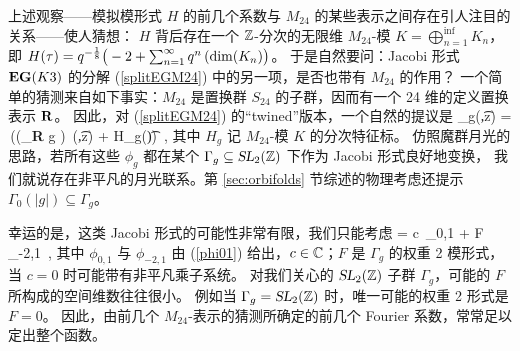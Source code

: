 

上述观察——模拟模形式 $H$ 的前几个系数与 $M_{24}$ 的某些表示之间存在引人注目的关系——使人猜想：
$H$ 背后存在一个 $\mathbb{Z}$-分次的无限维 $M_{24}$-模 $K= \bigoplus_{n=1}^\inf  K_n$，
即 $H(\tau) =q^{-\frac{1}{8}}\big( -2  + \sum_{n=1}^\infty q^n\,({\rm dim}({K_n} )\big)$。
于是自然要问：Jacobi 形式 ${\bf EG}(K3)$ 的分解 (\ref{splitEGM24}) 中的另一项，是否也带有 $M_{24}$ 的作用？
一个简单的猜测来自如下事实：$M_{24}$ 是置换群 $S_{24}$ 的子群，因而有一个 24 维的定义置换表示 ${\bf R}$。
因此，对 (\ref{splitEGM24}) 的“twined”版本，一个自然的提议是
\be\label{K3_EG_Fou}
	 \phi_g(\t,z) 
 		=   \,\big((\tr_{\bf R} {g } ) \,\m(\t,z) + H_g(\t)\big)~,
	\ee
其中 $H_g$ 记 $M_{24}$-模 $K$ 的分次特征标。
仿照魔群月光的思路，若所有这些 $\phi_g$ 都在某个 $\Gamma_g \subseteq \operatorname{\textsl{SL}}_2(\mathbb{Z})$ 下作为 Jacobi 形式良好地变换，
我们就说存在非平凡的月光联系。第 \ref{sec:orbifolds} 节综述的物理考虑还提示 $ \Gamma_0(|g|) \subseteq \Gamma_g$。


幸运的是，这类 Jacobi 形式的可能性非常有限，我们只能考虑
\be
\phi = c\, \phi_{0,1} + F \,\phi_{-2,1}~,
\ee
其中 $\phi_{0,1}$ 与 $\phi_{-2,1}$ 由 (\ref{phi01}) 给出，$c\in \mathbb{C}$；$F$ 是 $\Gamma_g$ 的权重 2 模形式，当 $c=0$ 时可能带有非平凡乘子系统。
对我们关心的 $\operatorname{\textsl{SL}}_2(\mathbb{Z})$ 子群 $\Gamma_g$，可能的 $F$ 所构成的空间维数往往很小。
例如当 $\Gamma_g = \operatorname{\textsl{SL}}_2(\mathbb{Z})$ 时，唯一可能的权重 2 形式是 $F=0$。
因此，由前几个 $M_{24}$-表示的猜测所确定的前几个 Fourier 系数，常常足以定出整个函数。


